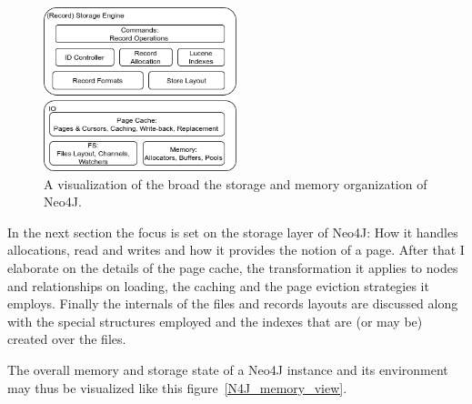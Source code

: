 \documentclass[a4paper,10pt]{article}
\begin{document}
        \begin{figure}[htp]\label{N4J_Storage}
        \begin{center}
        \includegraphics[keepaspectratio,width=0.5\textwidth]{img/00_intro/N4J_Storage.png}
        \end{center}
        \caption{A visualization of the broad the storage and memory organization of Neo4J.} %
        \end{figure}

        In the next section the focus is set on the storage layer of Neo4J\@: How it handles allocations, read and writes and how it provides the notion of a page.
        After that I elaborate on the details of the page cache, the transformation it applies to nodes and relationships on loading, the caching and the page eviction strategies it employs.
        Finally the internals of the files and records layouts are discussed along with the special structures employed and the indexes that are (or may be) created over the files.

        The overall memory and storage state of a Neo4J instance and its environment may thus be visualized like this figure~\ref{N4J_memory_view}.
\end{document}

